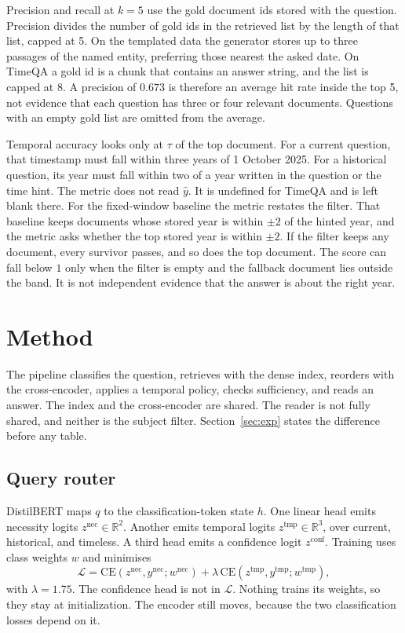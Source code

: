 \documentclass[11pt,letterpaper]{article}
\begin{document}
Precision and recall at $k{=}5$ use the gold document ids stored with the question.
Precision divides the number of gold ids in the retrieved list by the length of that list, capped at 5.
On the templated data the generator stores up to three passages of the named entity, preferring those nearest the asked date.
On TimeQA a gold id is a chunk that contains an answer string, and the list is capped at 8.
A precision of $0.673$ is therefore an average hit rate inside the top 5, not evidence that each question has three or four relevant documents.
Questions with an empty gold list are omitted from the average.

Temporal accuracy looks only at $\tau$ of the top document.
For a current question, that timestamp must fall within three years of 1 October 2025.
For a historical question, its year must fall within two of a year written in the question or the time hint.
The metric does not read $\hat{y}$.
It is undefined for TimeQA and is left blank there.
For the fixed-window baseline the metric restates the filter.
That baseline keeps documents whose stored year is within $\pm 2$ of the hinted year, and the metric asks whether the top stored year is within $\pm 2$.
If the filter keeps any document, every survivor passes, and so does the top document.
The score can fall below $1$ only when the filter is empty and the fallback document lies outside the band.
It is not independent evidence that the answer is about the right year.

\section{Method}
\label{sec:method}

The pipeline classifies the question, retrieves with the dense index, reorders with the cross-encoder, applies a temporal policy, checks sufficiency, and reads an answer.
The index and the cross-encoder are shared.
The reader is not fully shared, and neither is the subject filter.
Section~\ref{sec:exp} states the difference before any table.

\subsection{Query router}
\label{sec:router}

DistilBERT maps $q$ to the classification-token state $h$.
One linear head emits necessity logits $z^{\mathrm{nec}}\in\mathbb{R}^{2}$.
Another emits temporal logits $z^{\mathrm{tmp}}\in\mathbb{R}^{3}$, over current, historical, and timeless.
A third head emits a confidence logit $z^{\mathrm{conf}}$.
Training uses class weights $w$ and minimises
\begin{equation}
\mathcal{L}
= \mathrm{CE}\!\left(z^{\mathrm{nec}}, y^{\mathrm{nec}}; w^{\mathrm{nec}}\right)
+ \lambda\,
\mathrm{CE}\!\left(z^{\mathrm{tmp}}, y^{\mathrm{tmp}}; w^{\mathrm{tmp}}\right),
\label{eq:loss}
\end{equation}
with $\lambda = 1.75$.
The confidence head is not in $\mathcal{L}$.
Nothing trains its weights, so they stay at initialization.
The encoder still moves, because the two classification losses depend on it.
\end{document}
